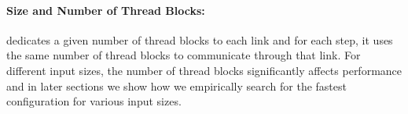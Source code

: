 \paragraph{Size and Number of Thread Blocks:} \tool{} dedicates a given number of thread blocks to each link and for each step, it uses the same number of thread blocks to communicate through that link. 
For different input sizes, the number of thread blocks significantly affects performance and in later sections we show how we empirically search for the fastest configuration for various input sizes.




